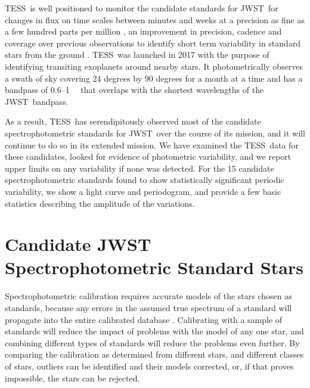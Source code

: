 \documentclass[twocolumn]{aastex631}
\newcommand{\webb}{JWST}
\newcommand{\tess}{TESS}
\newcommand{\mum}{\ifmmode{\rm \mu m}\else{$\mu$m}\fi}
\begin{document}
\tess\ is well positioned to monitor the candidate standards for \webb\ for changes in flux on time scales between minutes and weeks at a precision as fine as a few hundred parts per million \citep{Ricker2015}, an improvement in precision, cadence and coverage over previous observations to identify short term variability in standard stars from the ground \citep[e.g.,][]{Marinoni2016}.  \tess\ was launched in 2017 with the purpose of identifying transiting exoplanets around nearby stars.  It photometrically observes a swath of sky covering 24 degrees by 90 degrees for a month at a time and has a bandpass of 0.6--1~\mum\ \citep{Ricker2015} that overlaps with the shortest wavelengths of the \webb\ bandpass.

As a result, \tess\ has serendipitously observed most of the candidate spectrophotometric standards for \webb\ over the course of its mission, and it will continue to do so in its extended mission.  We have examined the \tess\ data for these candidates, looked for evidence of photometric variability, and we report upper limits on any variability if none was detected.  For the 15 candidate spectrophotometric standards found to show statistically significant periodic variability, we show a light curve and periodogram, and provide a few basic statistics describing the amplitude of the variations. 


\section{Candidate JWST Spectrophotometric Standard Stars} 
\label{sec:targets}

Spectrophotometric calibration requires accurate models of the stars chosen as standards, because any errors in the assumed true spectrum of a standard will propagate into the entire calibrated database \citep[e.g.][]{Cohen1992, Price2002, Sloan2015}.  Calibrating with a sample of standards will reduce the impact of problems with the model of any one star, and combining different types of standards will reduce the problems even further.  By comparing the calibration as determined from different stars, and different classes of stars, outliers can be identified and their models corrected, or, if that proves impossible, the stars can be rejected.

\end{document}
